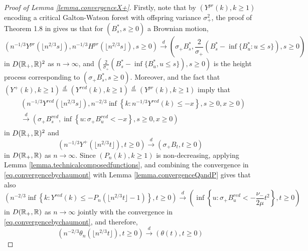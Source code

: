 \begin{proof}[Proof of Lemma \ref{lemma.convergenceX+}]
Firstly, note that by $(Y^{pr}(k),k\geq 1)$ encoding a critical Galton-Watson forest with offspring variance $\sigma_+^2$, the proof of Theorem 1.8 in \cite{legallRandomTreesApplications2005} gives us that for $(B^*_s,s\geq 0)$ a Brownian motion,
\begin{equation}\label{eq.convergenceX}\left(n^{-1/3}Y^{pr}\left(\lfloor n^{2/3}s\rfloor \right), n^{-1/3}H^{pr}\left(\lfloor n^{2/3}s\rfloor \right), s\geq 0 \right) \overset{d}{\to} \left(\sigma_+ B^*_s,\frac{2}{\sigma_+} \left(B^*_s-\inf\{B^*_u:u\leq s\}\right),  s\geq 0\right) \end{equation}
 in $D({\mathbb R}_+,{\mathbb R})^2$ as $n\to \infty$, and $\left(\frac{2}{\sigma_+}(B^*_s-\inf\{B^*_u,u\leq s\}),s\geq 0\right)$ is the height process corresponding to $\left(\sigma_+ B^*_s,s \geq 0\right)$. Moreover, \cite{chaumontInvariancePrinciplesLocal2010} and the fact that $(Y^+(k),k\geq 1)\overset{d}{=}(Y^{red}(k),k\geq 1)\overset{d}{=}(Y^{pr}(k),k\geq 1)$ imply that
\begin{align}\begin{split}\label{eq.convergencebychaumont}&\left(n^{-1/3}Y^{red}\left(\lfloor n^{2/3} s \rfloor \right), n^{-2/3}\inf\left\{k:n^{-1/3}Y^{red}(k) \leq -x\right\}, s \geq 0, x\geq 0 \right)\\
&\overset{d}{\to}\left( \sigma_+ B^{red}_s, \inf\left\{u:\sigma_+ B^{red}_u < -x\right\}, s\geq 0, x \geq 0\right)\end{split}\end{align}
in $D({\mathbb R}_+,{\mathbb R})^2$ and 
$$\left(n^{-1/3}Y^+\left(\lfloor n^{2/3} t\rfloor \right),t\geq 0\right)\overset{d}{\to}\left(\sigma_+ B_t, t\geq 0\right)$$
in $D({\mathbb R}_+,{\mathbb R})$ as $n\to \infty$. 
Since $(P_n(k),k\geq 1)$ is non-decreasing, applying Lemma \ref{lemma.technicalcomposedfunctions}, and combining the convergence in \eqref{eq.convergencebychaumont} with Lemma \ref{lemma.convergenceQandP} gives that also
$$\left(n^{-2/3}\inf\left\{k:Y^{red}(k) \leq - P_n\left(\lfloor n^{2/3} t \rfloor -1\right)\right\},t\geq 0\right)\overset{d}{\to}\left(\inf\left\{u:\sigma_+ B^{red}_u< -\frac{\nu_-}{2\mu} t^2\right\},t\geq 0\right)$$
  in $D({\mathbb R}_+,{\mathbb R})$ as $n\to \infty$ jointly with the convergence in \eqref{eq.convergencebychaumont},
  and therefore, 
 \begin{equation}\label{eq.convergencetheta}\left(n^{-2/3}\theta_n\left(\lfloor n^{2/3}t\rfloor \right),t\geq 0 \right) \overset{d}{\to} \left(\theta(t),t\geq 0\right)\end{equation}

\end{proof}
